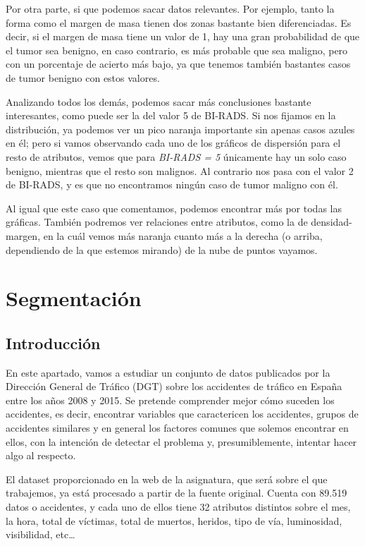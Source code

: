 \documentclass[11pt,a4paper]{article}
\begin{document}
Por otra parte, si que podemos sacar datos relevantes. Por ejemplo, tanto la forma como el margen de masa tienen dos zonas bastante
bien diferenciadas. Es decir, si el margen de masa tiene un valor de 1, hay una gran probabilidad de que el tumor sea benigno, en
caso contrario, es más probable que sea maligno, pero con un porcentaje de acierto más bajo, ya que tenemos también bastantes casos de
tumor benigno con estos valores.

Analizando todos los demás, podemos sacar más conclusiones bastante interesantes, como puede ser la del valor 5 de BI-RADS. Si nos
fijamos en la distribución, ya podemos ver un pico naranja importante sin apenas casos azules en él; pero si vamos observando cada
uno de los gráficos de dispersión para el resto de atributos, vemos que para \textit{BI-RADS = 5} únicamente hay un solo caso benigno,
mientras que el resto son malignos. Al contrario nos pasa con el valor 2 de BI-RADS, y es que no encontramos ningún caso de tumor
maligno con él.

Al igual que este caso que comentamos, podemos encontrar más por todas las gráficas. También podremos ver relaciones entre atributos,
como la de densidad-margen, en la cuál vemos más naranja cuanto más a la derecha (o arriba, dependiendo de la que estemos mirando) de
la nube de puntos vayamos.




\section{Segmentación}

\subsection{Introducción}
En este apartado, vamos a estudiar un conjunto de datos publicados por la Dirección General de Tráfico (DGT) sobre los accidentes de
tráfico en España entre los años 2008 y 2015. Se pretende comprender mejor cómo suceden los accidentes, es decir, encontrar variables
que caractericen los accidentes, grupos de accidentes similares y en general los factores comunes que solemos encontrar en ellos, con
la intención de detectar el problema y, presumiblemente, intentar hacer algo al respecto.

El dataset proporcionado en la web de la asignatura, que será sobre el que trabajemos, ya está procesado a partir de la fuente original.
Cuenta con 89.519 datos o accidentes, y cada uno de ellos tiene 32 atributos distintos sobre el mes, la hora, total de víctimas, total
de muertos, heridos, tipo de vía, luminosidad, visibilidad, etc\dots
\end{document}
